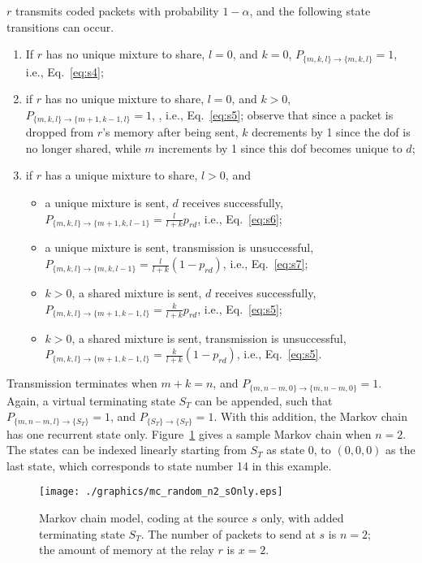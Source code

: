 \documentclass[journal, letterpaper]{IEEEtran}
\begin{document}
\noindent $r$ transmits coded packets with probability $1-\alpha$, and the following state transitions can occur.
\begin{enumerate}
    \item If $r$ has no unique mixture to share, $l=0$, and $k=0$, $P_{\{m,k,l\}\rightarrow\{m,k,l\}}= 1$, i.e., Eq.~\eqref{eq:s4};
    \item if $r$ has no unique mixture to share, $l=0$, and $k>0$, $P_{\{m,k,l\}\rightarrow\{m+1,k-1,l\}} = 1 $, , i.e., Eq.~\eqref{eq:s5}; observe that since a packet is dropped from $r$'s memory after being sent, $k$ decrements by 1 since the dof is no longer shared, while $m$ increments by 1 since this dof becomes unique to $d$;
    \item if $r$ has a unique mixture to share, $l>0$, and
        \begin{itemize}
        \item a unique mixture is sent, $d$ receives successfully,
            $P_{\{m,k,l\}\rightarrow\{m+1,k,l-1\}} = \frac{l}{l+k}p_{rd}$, i.e., Eq.~\eqref{eq:s6};
        \item a unique mixture is sent, transmission is unsuccessful,
            $P_{\{m,k,l\}\rightarrow\{m,k,l-1\}} = \frac{l}{l+k}(1-p_{rd})$, i.e., Eq.~\eqref{eq:s7};
        \item $k>0$, a shared mixture is sent, $d$ receives successfully,
            $P_{\{m,k,l\}\rightarrow\{m+1,k-1,l\}} = \frac{k}{l+k}p_{rd}$, i.e., Eq.~\eqref{eq:s5};
        \item $k>0$, a shared mixture is sent, transmission is unsuccessful,
            $P_{\{m,k,l\}\rightarrow\{m+1,k-1,l\}} = \frac{k}{l+k}(1-p_{rd})$, i.e., Eq.~\eqref{eq:s5}.
        \end{itemize}
\end{enumerate}

Transmission terminates when $m+k=n$, and $P_{\{m,n-m,0\}\rightarrow\{m,n-m,0\}}=1$. Again, a virtual terminating state $S_T$ can be appended, such that $P_{\{m,n-m,l\}\rightarrow\{S_T\}}=1$, and $P_{\{S_T\}\rightarrow\{S_T\}}=1$. With this addition, the Markov chain has one recurrent state only. Figure~\ref{fig:mc_n2_sOnly} gives a sample Markov chain when $n=2$. The states can be indexed linearly starting from $S_T$ as state 0, to $(0,0,0)$ as the last state, which corresponds to state number 14 in this example.

\begin{figure}[t!]
  \centering
  \texttt{[image: ./graphics/mc\_random\_n2\_sOnly.eps]}
  \caption{Markov chain model, coding at the source $s$ only,  with added terminating state $S_T$. The number of packets to send at $s$ is $n = 2$; the amount of memory at the relay $r$ is $x=2$.}
  \label{fig:mc_n2_sOnly}
\end{figure}
\end{document}
